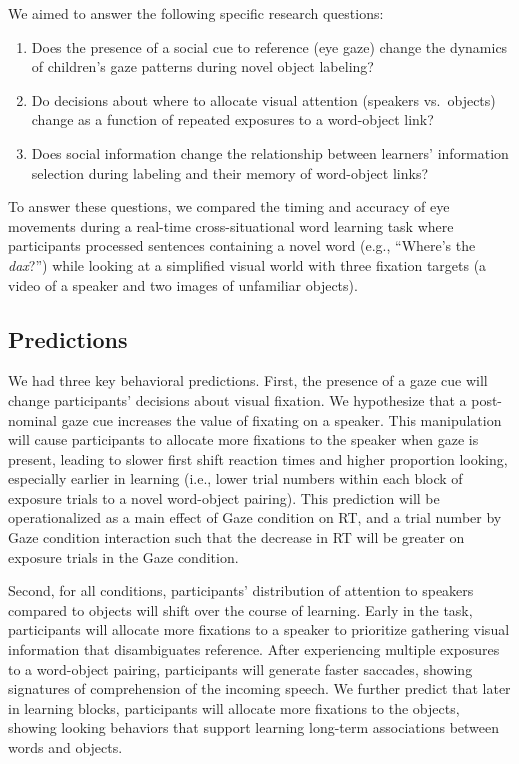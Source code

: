 \documentclass[man,floatsintext]{apa6}
\providecommand{\tightlist}{%
  \setlength{\itemsep}{0pt}\setlength{\parskip}{0pt}}
\begin{document}
We aimed to answer the following specific research questions:

\begin{enumerate}
\def\labelenumi{\arabic{enumi}.}
\tightlist
\item
  Does the presence of a social cue to reference (eye gaze) change the
  dynamics of children's gaze patterns during novel object labeling?\\
\item
  Do decisions about where to allocate visual attention (speakers
  vs.~objects) change as a function of repeated exposures to a
  word-object link?
\item
  Does social information change the relationship between learners'
  information selection during labeling and their memory of word-object
  links?
\end{enumerate}

To answer these questions, we compared the timing and accuracy of eye
movements during a real-time cross-situational word learning task where
participants processed sentences containing a novel word (e.g.,
\enquote{Where's the \emph{dax}?}) while looking at a simplified visual
world with three fixation targets (a video of a speaker and two images
of unfamiliar objects).

\subsection{Predictions}\label{predictions}

We had three key behavioral predictions. First, the presence of a gaze
cue will change participants' decisions about visual fixation. We
hypothesize that a post-nominal gaze cue increases the value of fixating
on a speaker. This manipulation will cause participants to allocate more
fixations to the speaker when gaze is present, leading to slower first
shift reaction times and higher proportion looking, especially earlier
in learning (i.e., lower trial numbers within each block of exposure
trials to a novel word-object pairing). This prediction will be
operationalized as a main effect of Gaze condition on RT, and a trial
number by Gaze condition interaction such that the decrease in RT will
be greater on exposure trials in the Gaze condition.

Second, for all conditions, participants' distribution of attention to
speakers compared to objects will shift over the course of learning.
Early in the task, participants will allocate more fixations to a
speaker to prioritize gathering visual information that disambiguates
reference. After experiencing multiple exposures to a word-object
pairing, participants will generate faster saccades, showing signatures
of comprehension of the incoming speech. We further predict that later
in learning blocks, participants will allocate more fixations to the
objects, showing looking behaviors that support learning long-term
associations between words and objects.
\end{document}
